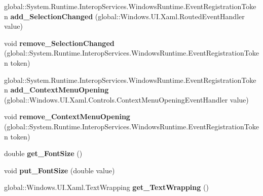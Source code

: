 \begin{DoxyCompactItemize}
global\+::\+System.\+Runtime.\+Interop\+Services.\+Windows\+Runtime.\+Event\+Registration\+Token {\bfseries add\+\_\+\+Selection\+Changed} (global\+::\+Windows.\+U\+I.\+Xaml.\+Routed\+Event\+Handler value)
\item 
\mbox{\label{interface_windows_1_1_u_i_1_1_xaml_1_1_controls_1_1_i_text_block_aa5f21aa6c1bfe8efdedfd5dbd95e003a}} 
void {\bfseries remove\+\_\+\+Selection\+Changed} (global\+::\+System.\+Runtime.\+Interop\+Services.\+Windows\+Runtime.\+Event\+Registration\+Token token)
\item 
\mbox{\label{interface_windows_1_1_u_i_1_1_xaml_1_1_controls_1_1_i_text_block_a1d8100da7fff6292db5c7e88860bb898}} 
global\+::\+System.\+Runtime.\+Interop\+Services.\+Windows\+Runtime.\+Event\+Registration\+Token {\bfseries add\+\_\+\+Context\+Menu\+Opening} (global\+::\+Windows.\+U\+I.\+Xaml.\+Controls.\+Context\+Menu\+Opening\+Event\+Handler value)
\item 
\mbox{\label{interface_windows_1_1_u_i_1_1_xaml_1_1_controls_1_1_i_text_block_a68593635321b0b8cd439a3d341f86485}} 
void {\bfseries remove\+\_\+\+Context\+Menu\+Opening} (global\+::\+System.\+Runtime.\+Interop\+Services.\+Windows\+Runtime.\+Event\+Registration\+Token token)
\item 
\mbox{\label{interface_windows_1_1_u_i_1_1_xaml_1_1_controls_1_1_i_text_block_a9912fea3536da888623b2947225a9d6d}} 
double {\bfseries get\+\_\+\+Font\+Size} ()
\item 
\mbox{\label{interface_windows_1_1_u_i_1_1_xaml_1_1_controls_1_1_i_text_block_a6bee3c5a6d60cdfb17958f446638701f}} 
void {\bfseries put\+\_\+\+Font\+Size} (double value)
\item 
\mbox{\label{interface_windows_1_1_u_i_1_1_xaml_1_1_controls_1_1_i_text_block_a912cc8618a3b0c565221ad7580825895}} 
global\+::\+Windows.\+U\+I.\+Xaml.\+Text\+Wrapping {\bfseries get\+\_\+\+Text\+Wrapping} ()
\item 

\end{DoxyCompactItemize}
